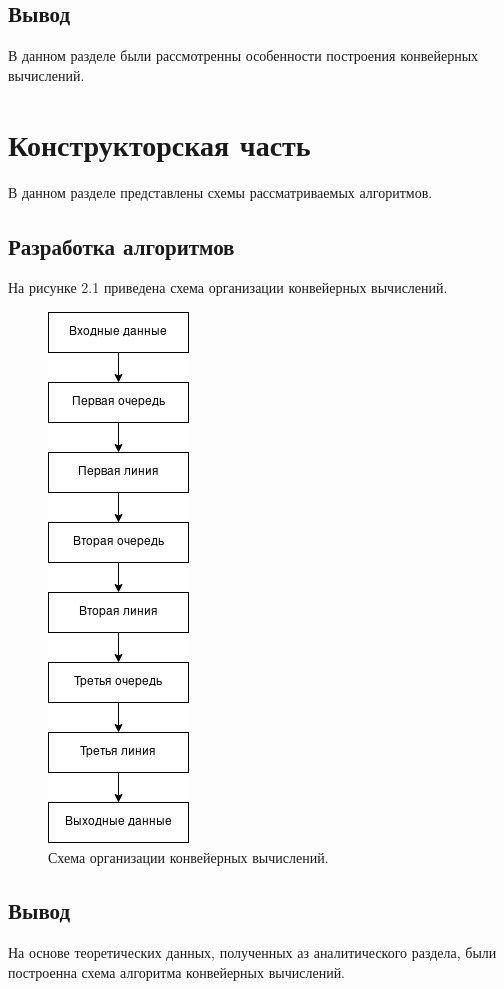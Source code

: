 \documentclass[12pt]{report}
\begin{document}
\section*{Вывод}
	В данном разделе были рассмотренны особенности построения конвейерных вычислений.

\chapter{Конструкторская часть}

В данном разделе представлены схемы рассматриваемых алгоритмов.

\section{Разработка алгоритмов}

На рисунке 2.1 приведена схема организации конвейерных вычислений.

\begin{figure}[h]
	\centering
	\includegraphics[scale=0.6]{scheme_lab05.jpg}
	\caption{Схема организации конвейерных вычислений.}
	\label{fig:mpr}
\end{figure}


\section*{Вывод}
На основе теоретических данных, полученных аз аналитического раздела, были построенна схема алгоритма конвейерных вычислений.
\end{document}
